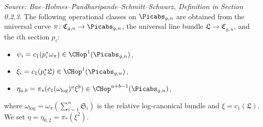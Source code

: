 \begin{definition}
  \label{def:tautological_classes}
  \textit{Source: Bae--Holmes--Pandharipande--Schmitt--Schwarz, Definition in Section 0.2.3.}
  The following operational classes on $\Picabs_{g,n}$ are obtained from the universal
  curve $\pi\colon \mathfrak{C}_{g,n} \to \Picabs_{g,n}$, the universal line bundle
  $\mathfrak{L} \to \mathfrak{C}_{g,n}$, and the $i$th section $p_i$:
  \begin{itemize}
  \item $\psi_i = c_1(p_i^* \omega_\pi) \in \CHop^1(\Picabs_{g,n})$,
  \item $\xi_i = c_1(p_i^* \mathfrak{L}) \in \CHop^1(\Picabs_{g,n})$,
  \item $\eta_{a,b} = \pi_*(c_1(\omega_{\log})^a \xi^b) \in \CHop^{a+b-1}(\Picabs_{g,n})$,
  \end{itemize}
  where $\omega_{\log} = \omega_\pi(\sum_{i=1}^n \mathfrak{S}_i)$ is the relative
  log-canonical bundle and $\xi = c_1(\mathfrak{L})$.
  We set $\eta = \eta_{0,2} = \pi_*(\xi^2)$.
\end{definition}

